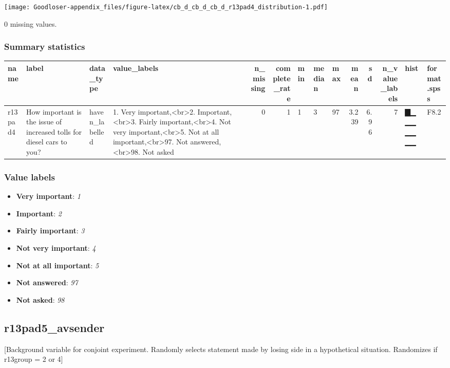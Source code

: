 \documentclass[
]{book}
\providecommand{\tightlist}{%
  \setlength{\itemsep}{0pt}\setlength{\parskip}{0pt}}
\begin{document}
\texttt{[image: Goodloser-appendix\_files/figure-latex/cb\_d\_cb\_d\_cb\_d\_r13pad4\_distribution-1.pdf]}

0 missing values.

\hypertarget{r13pad4_summary}{%
\subsubsection{Summary statistics}\label{r13pad4_summary}}

\begin{tabular}{l|l|l|l|r|r|l|l|l|r|r|r|l|l}
\hline
name & label & data_type & value_labels & n_missing & complete_rate & min & median & max & mean & sd & n_value_labels & hist & format.spss\\
\hline
r13pad4 & How important is the issue of increased tolls for diesel cars to you? & haven_labelled & 1. Very important,<br>2. Important,<br>3. Fairly important,<br>4. Not very important,<br>5. Not at all important,<br>97. Not answered,<br>98. Not asked & 0 & 1 & 1 & 3 & 97 & 3.239 & 6.96 & 7 & ▇▁▁▁▁▁▁▁ & F8.2\\
\hline
\end{tabular}

\hypertarget{r13pad4_labels}{%
\subsubsection{Value labels}\label{r13pad4_labels}}

\begin{itemize}
\tightlist
\item
  \textbf{Very important}: \emph{1}
\item
  \textbf{Important}: \emph{2}
\item
  \textbf{Fairly important}: \emph{3}
\item
  \textbf{Not very important}: \emph{4}
\item
  \textbf{Not at all important}: \emph{5}
\item
  \textbf{Not answered}: \emph{97}
\item
  \textbf{Not asked}: \emph{98}
\end{itemize}

\hypertarget{r13pad5_avsender}{%
\subsection{r13pad5\_avsender}\label{r13pad5_avsender}}

{[}Background variable for conjoint experiment. Randomly selects statement made by losing side in a hypothetical situation. Randomizes if r13group = 2 or 4{]}
\end{document}

